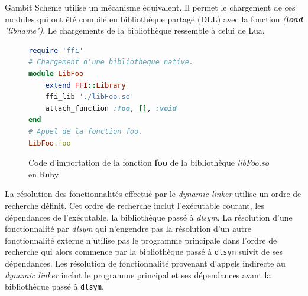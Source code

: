 Gambit Scheme utilise un mécanisme équivalent. Il permet le chargement de ces modules qui ont été compilé
en bibliothèque partagé (DLL) avec la fonction \textit{(\textbf{load} "libname")}. Le chargements de la
bibliothèque ressemble à celui de Lua.


\begin{center}
\begin{figure}[ht]
\begin{lstlisting}[language=ruby,frame=single]
require 'ffi'
# Chargement d'une bibliotheque native.
module LibFoo
    extend FFI::Library
    ffi_lib './libFoo.so'
    attach_function :foo, [], :void
end
# Appel de la fonction foo.
LibFoo.foo
\end{lstlisting}
\caption{Code d'importation de la fonction \textbf{foo} de la bibliothèque \textit{libFoo.so} en Ruby}
\end{figure}
\end{center}

La résolution des fonctionnalités effectué par le \textit{dynamic linker} utilise un ordre de recherche
définit. Cet ordre de recherche inclut l'exécutable courant, les dépendances de l'exécutable, la bibliothèque
passé à \textit{dlsym}. La résolution d'une fonctionnalité par \textit{dlsym} qui n'engendre pas la résolution
d'un autre fonctionnalité externe n'utilise pas le programme principale dans l'ordre de recherche qui alors
commence par la bibliothèque passé à \verb|dlsym| suivit de ses dépendances. Les résolution de fonctionnalité
provenant d'appels indirecte au \textit{dynamic linker} inclut le programme principal et ses dépendances avant
la bibliothèque passé à \verb|dlsym|.

